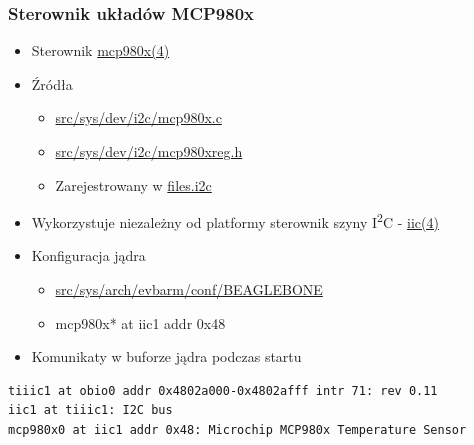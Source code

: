 \documentclass[dvipsnames,table]{beamer}
\begin{document}
\begin{frame}[fragile]
\frametitle{Sterownik układów MCP980x}
\begin{itemize}
	\item Sterownik \href{http://netbsd.gw.com/cgi-bin/man-cgi?mcp980x+4+NetBSD-current}{mcp980x(4)}
	\item Źródła
	\begin{itemize}
		\item \href{http://nxr.netbsd.org/xref/src/sys/dev/i2c/mcp980x.c}{src/sys/dev/i2c/mcp980x.c}
		\item \href{http://nxr.netbsd.org/xref/src/sys/dev/i2c/mcp980xreg.h}{src/sys/dev/i2c/mcp980xreg.h}
		\item Zarejestrowany w \href{http://nxr.netbsd.org/xref/src/sys/dev/i2c/files.i2c}{files.i2c}
	\end{itemize}
	\item Wykorzystuje niezależny od platformy sterownik szyny I\textsuperscript{2}C - \href{http://netbsd.gw.com/cgi-bin/man-cgi?iic+9+NetBSD-current}{iic(4)}
	\item Konfiguracja jądra
	\begin{itemize}
		\item \href{http://nxr.netbsd.org/xref/src/sys/arch/evbarm/conf/BEAGLEBONE}{src/sys/arch/evbarm/conf/BEAGLEBONE}
		\item mcp980x* at iic1 addr 0x48
	\end{itemize}
	\item Komunikaty w buforze jądra podczas startu
\end{itemize}
\scriptsize
\begin{verbatim}
tiiic1 at obio0 addr 0x4802a000-0x4802afff intr 71: rev 0.11
iic1 at tiiic1: I2C bus
mcp980x0 at iic1 addr 0x48: Microchip MCP980x Temperature Sensor
\end{verbatim}
\end{frame}
\end{document}
